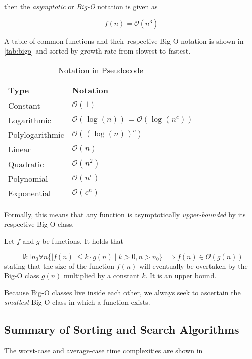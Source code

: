 then the \emph{asymptotic} or \emph{Big-O} notation is given as 

\[
	f(n) = \mathcal{O}(n^3)
		\]  
	
A table of common functions and their respective Big-O notation is shown in \autoref{tab:bigo} and sorted by growth rate from slowest to fastest.

\begin{table}[ht]
	\centering
	\begin{tabular}{ll}
	\toprule
	\textbf{Type}  & \textbf{Notation} \\ \midrule
	Constant & \( \mathcal{O}(1) \) \\
	Logarithmic &  \(\mathcal{O}(\log(n)) =\mathcal{O}(\log(n^c))\) \\
	Polylogarithmic & \(\mathcal{O}((\log(n))^c) \) \\
	Linear & \(\mathcal{O}(n) \) \\
	Quadratic & \(\mathcal{O}(n^2) \)  \\
	Polynomial & \(\mathcal{O}(n^c) \) \\
	Exponential & \(\mathcal{O}(c^n) \) \\
	\bottomrule
	\end{tabular}
	\caption{Notation in Pseudocode}\label{tab:bigo}
	\end{table}

Formally, this means that any function is asymptotically \emph{upper-bounded} by its respective Big-O class.

Let \( f \) and \( g \) be functions. It holds that

\[
	\exists k \exists n_0 \forall n \{|f(n)| \leq k \cdot g(n) \mid k > 0, n > n_0  \} \implies f(n) \in \mathcal{O}(g(n))
\]
stating that the size of the function \( f(n) \) will eventually be overtaken by the Big-O class \( g(n) \) multiplied by a constant \( k \). It is an upper bound.

Because Big-O classes live inside each other, we always seek to ascertain the \emph{smallest} Big-O class in which a function exists.

\subsection{Summary of Sorting and Search Algorithms}
The worst-case and average-case time complexities are shown in 

